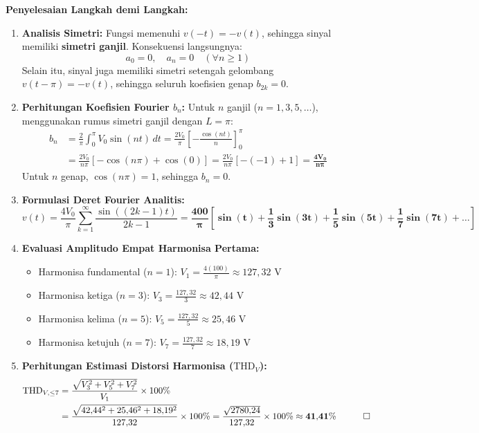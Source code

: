 \documentclass[11pt,a4paper]{article}
\theoremstyle{definition}
\begin{document}
\noindent\textbf{Penyelesaian Langkah demi Langkah:}
\begin{enumerate}[leftmargin=*]
    \item \textbf{Analisis Simetri:}
    Fungsi memenuhi $v(-t) = -v(t)$, sehingga sinyal memiliki \textbf{simetri ganjil}. Konsekuensi langsungnya:
    \begin{equation*}
        a_0 = 0, \quad a_n = 0 \quad (\forall n \ge 1)
    \end{equation*}
    Selain itu, sinyal juga memiliki simetri setengah gelombang $v(t - \pi) = -v(t)$, sehingga seluruh koefisien genap $b_{2k} = 0$.
    
    \item \textbf{Perhitungan Koefisien Fourier $b_n$:}
    Untuk $n$ ganjil ($n = 1, 3, 5, \dots$), menggunakan rumus simetri ganjil dengan $L = \pi$:
    \begin{align*}
        b_n &= \frac{2}{\pi} \int_{0}^{\pi} V_0 \sin(nt) \, dt = \frac{2 V_0}{\pi} \left[ -\frac{\cos(nt)}{n} \right]_{0}^{\pi} \\
            &= \frac{2 V_0}{n\pi} [-\cos(n\pi) + \cos(0)] = \frac{2 V_0}{n\pi} [-(-1) + 1] = \mathbf{\frac{4 V_0}{n\pi}}
    \end{align*}
    Untuk $n$ genap, $\cos(n\pi) = 1$, sehingga $b_n = 0$.
    
    \item \textbf{Formulasi Deret Fourier Analitis:}
    \begin{equation*}
        v(t) = \frac{4 V_0}{\pi} \sum_{k=1}^{\infty} \frac{\sin((2k-1)t)}{2k-1} = \mathbf{\frac{400}{\pi} \left[ \sin(t) + \frac{1}{3}\sin(3t) + \frac{1}{5}\sin(5t) + \frac{1}{7}\sin(7t) + \dots \right]}
    \end{equation*}
    
    \item \textbf{Evaluasi Amplitudo Empat Harmonisa Pertama:}
    \begin{itemize}[leftmargin=*]
        \item Harmonisa fundamental ($n=1$): $V_1 = \frac{4(100)}{\pi} \approx 127{,}32\text{ V}$
        \item Harmonisa ketiga ($n=3$): $V_3 = \frac{127{,}32}{3} \approx 42{,}44\text{ V}$
        \item Harmonisa kelima ($n=5$): $V_5 = \frac{127{,}32}{5} \approx 25{,}46\text{ V}$
        \item Harmonisa ketujuh ($n=7$): $V_7 = \frac{127{,}32}{7} \approx 18{,}19\text{ V}$
    \end{itemize}
    
    \item \textbf{Perhitungan Estimasi Distorsi Harmonisa ($\text{THD}_V$):}
    \begin{align*}
        \text{THD}_{V,\le 7} &= \frac{\sqrt{V_3^2 + V_5^2 + V_7^2}}{V_1} \times 100\% \\
        &= \frac{\sqrt{42{,}44^2 + 25{,}46^2 + 18{,}19^2}}{127{,}32} \times 100\% = \frac{\sqrt{2780{,}24}}{127{,}32} \times 100\% \approx \mathbf{41{,}41\%} \quad \qed
    \end{align*}
\end{enumerate}
\end{document}
